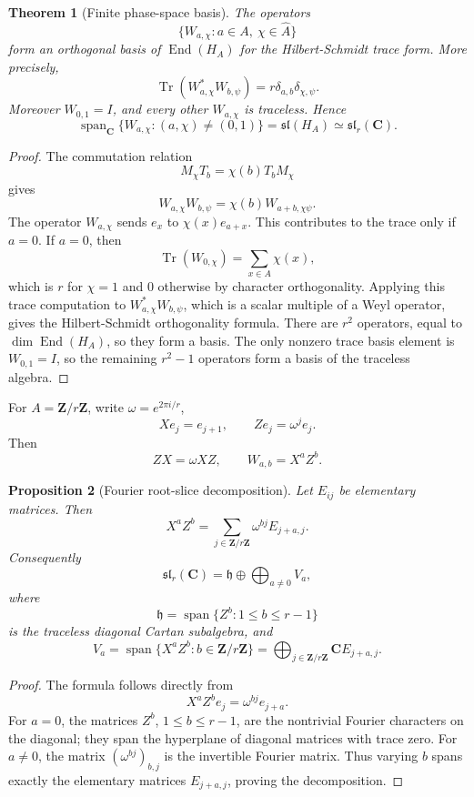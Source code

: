 \documentclass[11pt]{article}
\newcommand{\C}{\mathbf C}
\newcommand{\Z}{\mathbf Z}
\newcommand{\Tr}{\operatorname{Tr}}
\newcommand{\End}{\operatorname{End}}
\newcommand{\Span}{\operatorname{span}}
\theoremstyle{plain}
\newtheorem{theorem}{Theorem}[section]
\newtheorem{proposition}[theorem]{Proposition}
\theoremstyle{definition}
\begin{document}
\begin{theorem}[Finite phase-space basis]\label{thm:phase-basis}
The operators
\[
   \{W_{a,\chi}:a\in A,\ \chi\in\widehat A\}
\]
form an orthogonal basis of \(\End(H_A)\) for the Hilbert-Schmidt trace form.  More precisely,
\[
   \Tr(W_{a,\chi}^*W_{b,\psi})=r\delta_{a,b}\delta_{\chi,\psi}.
\]
Moreover \(W_{0,1}=I\), and every other \(W_{a,\chi}\) is traceless.  Hence
\[
   \Span_\C\{W_{a,\chi}:(a,\chi)\ne(0,1)
\}=\mathfrak{sl}(H_A)\simeq\mathfrak{sl}_r(\C).
\]
\end{theorem}

\begin{proof}
The commutation relation
\[
   M_\chi T_b=\chi(b)T_bM_\chi
\]
gives
\[
   W_{a,\chi}W_{b,\psi}=\chi(b)W_{a+b,\chi\psi}.
\]
The operator \(W_{a,\chi}\) sends \(e_x\) to \(\chi(x)e_{a+x}\).  This contributes to the trace only if \(a=0\).  If \(a=0\), then
\[
   \Tr(W_{0,\chi})=\sum_{x\in A}\chi(x),
\]
which is \(r\) for \(\chi=1\) and \(0\) otherwise by character orthogonality.  Applying this trace computation to \(W_{a,\chi}^*W_{b,\psi}\), which is a scalar multiple of a Weyl operator, gives the Hilbert-Schmidt orthogonality formula.  There are \(r^2\) operators, equal to \(\dim\End(H_A)\), so they form a basis.  The only nonzero trace basis element is \(W_{0,1}=I\), so the remaining \(r^2-1\) operators form a basis of the traceless algebra.
\end{proof}

For \(A=\Z/r\Z\), write \(\omega=e^{2\pi i/r}\),
\[
   Xe_j=e_{j+1},
   \qquad
   Ze_j=\omega^j e_j.
\]
Then
\[
   ZX=\omega XZ,
   \qquad
   W_{a,b}=X^aZ^b.
\]

\begin{proposition}[Fourier root-slice decomposition]\label{prop:root-slice}
Let \(E_{ij}\) be elementary matrices.  Then
\[
   X^aZ^b=\sum_{j\in\Z/r\Z}\omega^{bj}E_{j+a,j}.
\]
Consequently
\[
   \mathfrak{sl}_r(\C)=\mathfrak h\oplus\bigoplus_{a\ne0}V_a,
\]
where
\[
   \mathfrak h=\Span\{Z^b:1\le b\le r-1\}
\]
is the traceless diagonal Cartan subalgebra, and
\[
   V_a=\Span\{X^aZ^b:b\in\Z/r\Z\}=\bigoplus_{j\in\Z/r\Z}\C E_{j+a,j}.
\]
\end{proposition}

\begin{proof}
The formula follows directly from
\[
   X^aZ^be_j=\omega^{bj}e_{j+a}.
\]
For \(a=0\), the matrices \(Z^b\), \(1\le b\le r-1\), are the nontrivial Fourier characters on the diagonal; they span the hyperplane of diagonal matrices with trace zero.  For \(a\ne0\), the matrix \((\omega^{bj})_{b,j}\) is the invertible Fourier matrix.  Thus varying \(b\) spans exactly the elementary matrices \(E_{j+a,j}\), proving the decomposition.
\end{proof}
\end{document}
